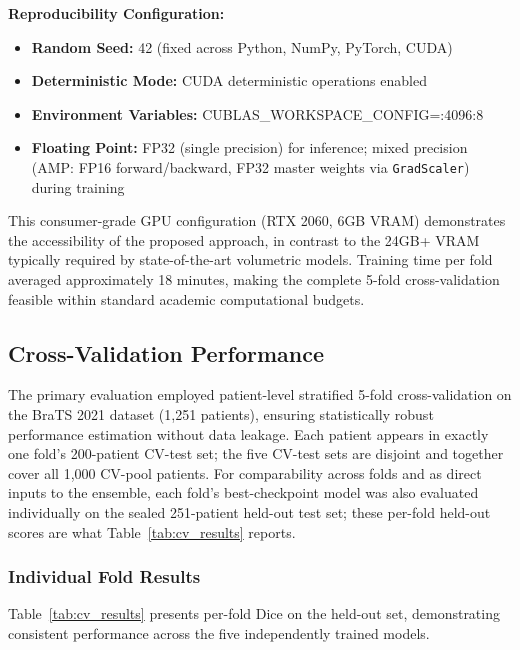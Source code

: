 \documentclass{article}
\begin{document}
\textbf{Reproducibility Configuration:}
\begin{itemize}
    \item \textbf{Random Seed:} 42 (fixed across Python, NumPy, PyTorch, CUDA)
    \item \textbf{Deterministic Mode:} CUDA deterministic operations enabled
    \item \textbf{Environment Variables:} CUBLAS\_WORKSPACE\_CONFIG=:4096:8
    \item \textbf{Floating Point:} FP32 (single precision) for inference; mixed precision (AMP: FP16 forward/backward, FP32 master weights via \texttt{GradScaler}) during training
\end{itemize}

This consumer-grade GPU configuration (RTX 2060, 6GB VRAM) demonstrates the accessibility of the proposed approach, in contrast to the 24GB+ VRAM typically required by state-of-the-art volumetric models. Training time per fold averaged approximately 18 minutes, making the complete 5-fold cross-validation feasible within standard academic computational budgets.


\subsection{Cross-Validation Performance}

The primary evaluation employed patient-level stratified 5-fold cross-validation on the BraTS 2021 dataset (1,251 patients), ensuring statistically robust performance estimation without data leakage. Each patient appears in exactly one fold's 200-patient CV-test set; the five CV-test sets are disjoint and together cover all 1,000 CV-pool patients. For comparability across folds and as direct inputs to the ensemble, each fold's best-checkpoint model was also evaluated individually on the sealed 251-patient held-out test set; these per-fold held-out scores are what Table~\ref{tab:cv_results} reports.

\subsubsection{Individual Fold Results}

Table~\ref{tab:cv_results} presents per-fold Dice on the held-out set, demonstrating consistent performance across the five independently trained models.
\end{document}
